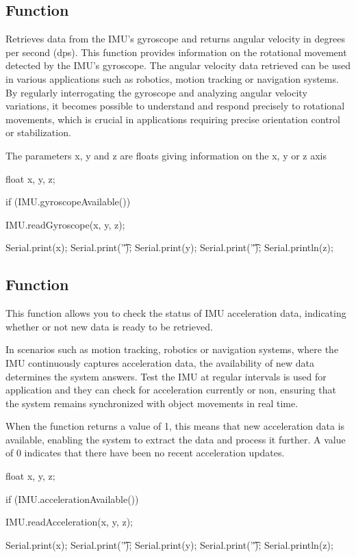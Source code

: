 \subsection{Function }

Retrieves data from the IMU's gyroscope and returns angular velocity in degrees per second (dps). This function provides information on the rotational movement detected by the IMU's gyroscope. The angular velocity data retrieved can be used in various applications such as robotics, motion tracking or navigation systems. By regularly interrogating the gyroscope and analyzing angular velocity variations, it becomes possible to understand and respond precisely to rotational movements, which is crucial in applications requiring precise orientation control or stabilization.

The parameters x, y and z are floats giving information on the x, y or z axis 

\begin{Arduino}
	float x, y, z;
	
	if (IMU.gyroscopeAvailable()) {
		IMU.readGyroscope(x, y, z);
		
		Serial.print(x);
		Serial.print('\t');
		Serial.print(y);
		Serial.print('\t');
		Serial.println(z);	}
\end{Arduino}



\subsection{Function }

This function allows you to check the status of IMU acceleration data, indicating whether or not new data is ready to be retrieved.

In scenarios such as motion tracking, robotics or navigation systems, where the IMU continuously captures acceleration data, the availability of new data determines the system answers. Test the IMU at regular intervals is used for application and they can check for acceleration currently or non, ensuring that the system remains synchronized with object movements in real time.

When the function returns a value of 1, this means that new acceleration data is available, enabling the system to extract the data and process it further. A value of 0 indicates that there have been no recent acceleration updates.

\begin{Arduino}
	float x, y, z;
	
	if (IMU.accelerationAvailable()) {
		IMU.readAcceleration(x, y, z);
		
		Serial.print(x);
		Serial.print('\t');
		Serial.print(y);
		Serial.print('\t');
		Serial.println(z); }
	
\end{Arduino}


